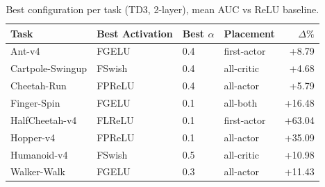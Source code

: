 \begin{table}[t]
\centering
\caption{Best configuration per task (TD3, 2-layer), mean AUC vs ReLU baseline.}
\label{tab:winner-td3-2-meanauc-relur}
\begin{tabular}{llllr}
\toprule
Task & Best Activation & Best $\alpha$ & Placement & $\Delta\%$ \\
\midrule
Ant-v4 & FGELU & 0.4 & first-actor & +8.79 \\
Cartpole-Swingup & FSwish & 0.4 & all-critic & +4.68 \\
Cheetah-Run & FPReLU & 0.4 & all-actor & +5.79 \\
Finger-Spin & FGELU & 0.1 & all-both & +16.48 \\
HalfCheetah-v4 & FLReLU & 0.1 & first-actor & +63.04 \\
Hopper-v4 & FPReLU & 0.1 & all-actor & +35.09 \\
Humanoid-v4 & FSwish & 0.5 & all-critic & +10.98 \\
Walker-Walk & FGELU & 0.3 & all-actor & +11.43 \\
\bottomrule
\end{tabular}
\end{table}
